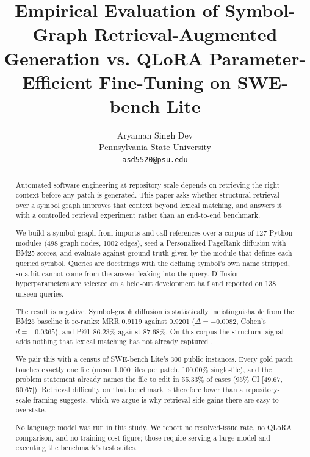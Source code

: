 \documentclass[10pt,twocolumn,letterpaper]{article}
\begin{document}
\title{Empirical Evaluation of Symbol-Graph Retrieval-Augmented Generation vs. QLoRA Parameter-Efficient Fine-Tuning on SWE-bench Lite}

\author{
Aryaman Singh Dev\\
Pennsylvania State University \\
\texttt{asd5520@psu.edu}
}

\maketitle

\begin{abstract}
Automated software engineering at repository scale depends on retrieving the right context before any patch is generated. This paper asks whether structural retrieval over a symbol graph improves that context beyond lexical matching, and answers it with a controlled retrieval experiment rather than an end-to-end benchmark.

We build a symbol graph from imports and call references over a corpus of 127 Python modules (498 graph nodes, 1002 edges), seed a Personalized PageRank diffusion with BM25 scores, and evaluate against ground truth given by the module that defines each queried symbol. Queries are docstrings with the defining symbol's own name stripped, so a hit cannot come from the answer leaking into the query. Diffusion hyperparameters are selected on a held-out development half and reported on 138 unseen queries.

The result is negative. Symbol-graph diffusion is statistically indistinguishable from the BM25 baseline it re-ranks: MRR 0.9119 against 0.9201 ($\Delta = -0.0082$, Cohen's $d = -0.0365$), and P@1 86.23\% against 87.68\%. On this corpus the structural signal adds nothing that lexical matching has not already captured \cite{arxiv_2501_02497}.

We pair this with a census of SWE-bench Lite's 300 public instances. Every gold patch touches exactly one file (mean 1.000 files per patch, 100.00\% single-file), and the problem statement already names the file to edit in 55.33\% of cases (95\% CI [49.67, 60.67]). Retrieval difficulty on that benchmark is therefore lower than a repository-scale framing suggests, which we argue is why retrieval-side gains there are easy to overstate.

No language model was run in this study. We report no resolved-issue rate, no QLoRA comparison, and no training-cost figure; those require serving a large model and executing the benchmark's test suites.
\end{abstract}
\end{document}
